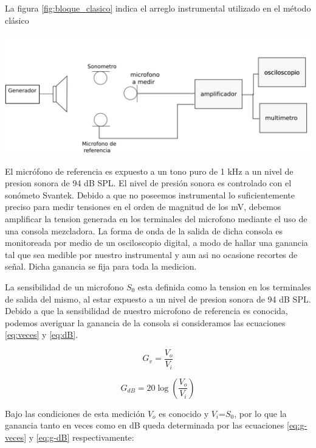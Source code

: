 \documentclass[]{article}
\makeatletter
\newenvironment{figurehere}   %
  {\def\@captype{figure}}   %
  {\par\medskip}
  {}              %
\makeatother
\begin{document}
\begin{multicols}{2}
La figura \ref{fig:bloque_clasico} indica el arreglo instrumental utilizado en el
método clásico

\begin{figurehere}
 \centering
 \includegraphics[width=\linewidth]{blockdiag}
 \label{fig:bloque_clasico}
\end{figurehere}

El micrófono de referencia es expuesto a un tono puro de 1 kHz a un nivel de
presion sonora de 94 dB SPL. El nivel de presión sonora es controlado con el
sonómeto Svantek. Debido a que no poseemos instrumental lo suficientemente
preciso para medir tensiones en el orden de magnitud de los mV, debemos amplificar
la tension generada en los terminales del microfono mediante el uso de una
consola mezcladora. La forma de onda de la salida de dicha consola es monitoreada
por medio de un osciloscopio digital, a modo de hallar una ganancia tal que sea
medible por nuestro instrumental y aun asi no ocasione recortes de señal. Dicha
ganancia se fija para toda la medicion.

La sensibilidad de un microfono $S_0$ esta definida como la tension en los terminales
de salida del mismo, al estar expuesto a un nivel de presion sonora de 94 dB SPL.
Debido a que la sensibilidad de nuestro microfono de referencia es conocida,
podemos averiguar la ganancia de la consola si consideramos las ecuaciones
\ref{eq:veces} y \ref{eq:dB}.

\begin{equation}
  G_v=\frac{V_o}{V_i}
  \label{eq:veces}
\end{equation}

\begin{equation}
  G_{dB}= 20 \log \left(\frac{V_o}{V_i}\right)
  \label{eq:dB}
\end{equation}

Bajo las condiciones de esta medición $V_o$ es conocido y $V_i$=$S_0$, por lo que
la ganancia tanto en veces como en dB queda determinada por las ecuaciones
\ref{eq:g-veces} y \ref{eq:g-dB} respectivamente:


\end{multicols}
\end{document}
